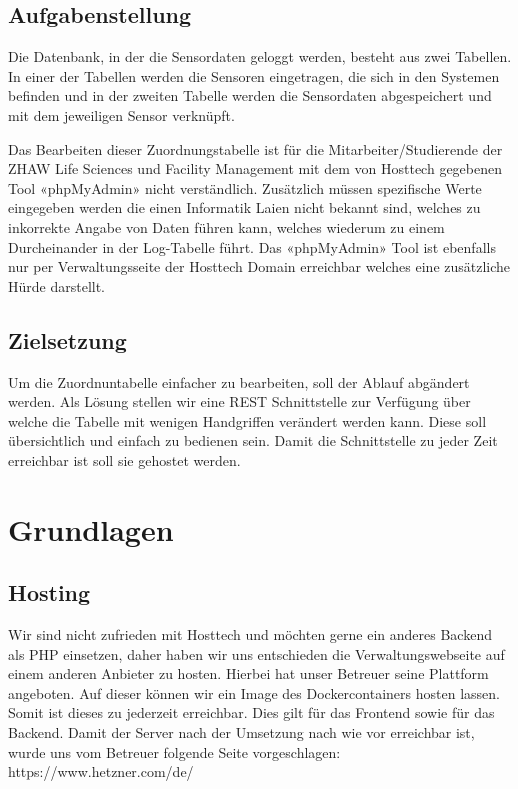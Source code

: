 \documentclass[a4paper]{article}
\begin{document}
	\subsection{Aufgabenstellung}
	Die Datenbank, in der die Sensordaten geloggt werden, besteht aus zwei Tabellen. In einer der Tabellen werden die Sensoren eingetragen, die sich in den Systemen befinden und in der zweiten Tabelle werden die Sensordaten abgespeichert und mit dem jeweiligen Sensor verknüpft.
	
	Das Bearbeiten dieser Zuordnungstabelle ist für die Mitarbeiter/Studierende der ZHAW Life Sciences und Facility Management mit dem von Hosttech gegebenen Tool «phpMyAdmin» nicht verständlich. Zusätzlich müssen spezifische Werte eingegeben werden die einen Informatik Laien nicht bekannt sind, welches zu inkorrekte Angabe von Daten führen kann, welches wiederum zu einem Durcheinander in der Log-Tabelle führt. 
	Das «phpMyAdmin» Tool ist ebenfalls nur per Verwaltungsseite der Hosttech Domain erreichbar welches eine zusätzliche Hürde darstellt.
	
	\subsection{Zielsetzung}
	Um die Zuordnuntabelle einfacher zu bearbeiten, soll der Ablauf abgändert werden. Als Lösung stellen wir eine REST Schnittstelle zur Verfügung über welche die Tabelle mit wenigen Handgriffen verändert werden kann. 
	Diese soll übersichtlich und einfach zu bedienen sein. Damit die Schnittstelle zu jeder Zeit erreichbar ist soll sie gehostet werden.
	
	\section{Grundlagen}
	
	\subsection{Hosting}
	Wir sind nicht zufrieden mit Hosttech und möchten gerne ein anderes Backend als PHP einsetzen, daher haben wir uns entschieden die Verwaltungswebseite auf einem anderen Anbieter zu hosten. 
	Hierbei hat unser Betreuer seine Plattform angeboten. Auf dieser können wir ein Image des Dockercontainers hosten lassen. Somit ist dieses zu jederzeit erreichbar. Dies gilt für das Frontend sowie für das Backend.
	Damit der Server nach der Umsetzung nach wie vor erreichbar ist, wurde uns vom Betreuer folgende Seite vorgeschlagen: https://www.hetzner.com/de/
	
\end{document}
